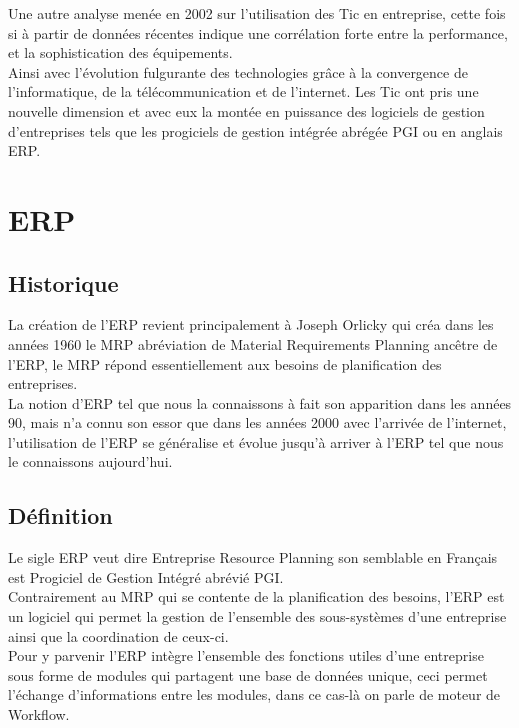         Une autre analyse menée en 2002 sur l’utilisation des Tic en entreprise, cette fois si à partir de données récentes indique une corrélation forte entre la performance, et la sophistication des équipements.\\

        Ainsi avec l’évolution fulgurante des technologies grâce à la convergence de l’informatique, de la télécommunication et de l’internet. Les Tic ont pris une nouvelle dimension et avec eux la montée en puissance des logiciels de gestion d’entreprises tels que les progiciels de gestion intégrée abrégée PGI ou en anglais ERP.

\section{ERP}
    \subsection{Historique}
        La création de l’ERP revient principalement à Joseph Orlicky qui créa dans les années 1960 le MRP abréviation de Material Requirements Planning ancêtre de l’ERP, le MRP répond essentiellement aux besoins de planification des entreprises.\\
        
        La notion d’ERP tel que nous la connaissons à fait son apparition dans les années 90, mais n’a connu son essor que dans les années 2000 avec l’arrivée de l’internet, l’utilisation de l’ERP se généralise et évolue jusqu’à arriver à l’ERP tel que nous le connaissons aujourd’hui.
        
    \subsection{Définition}
        Le sigle ERP veut dire Entreprise Resource Planning son semblable en Français est Progiciel de Gestion Intégré abrévié PGI.\\

        Contrairement au MRP qui se contente de la planification des besoins, l’ERP est un logiciel qui permet la gestion de l’ensemble des sous-systèmes d’une entreprise ainsi que la coordination de ceux-ci.\\

        Pour y parvenir l’ERP intègre l’ensemble des fonctions utiles d’une entreprise sous forme de modules qui partagent une base de données unique, ceci permet l’échange d’informations entre les modules, dans ce cas-là on parle de moteur de Workflow.
        
